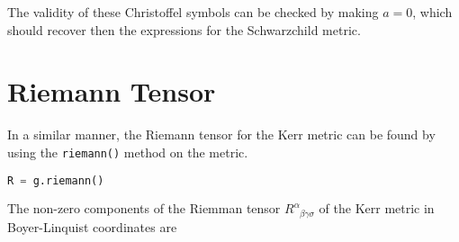 \documentclass[11pt,a4paper]{article}
\begin{document}
The validity of these Christoffel symbols can be checked by making $a = 0$, which should recover then the expressions for the Schwarzchild metric.

  

\section{Riemann Tensor}

In a similar manner, the Riemann tensor for the Kerr metric can be found by using the \texttt{riemann()} method on the metric.
\begin{lstlisting}[language = Python]
	R = g.riemann()
\end{lstlisting}

The non-zero components of the Riemman tensor $R^\alpha_{\phantom{\alpha}\beta \gamma \sigma}$ of the Kerr metric in Boyer-Linquist coordinates are
\end{document}

